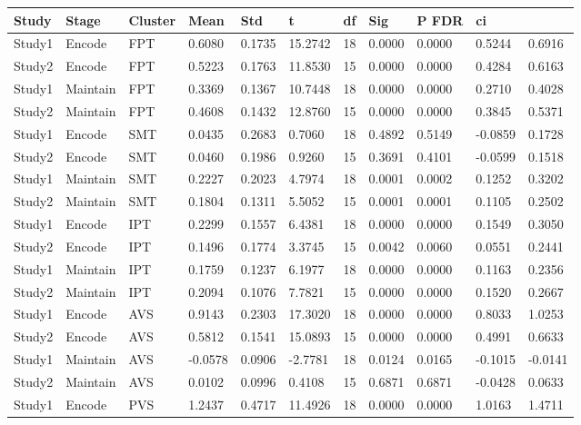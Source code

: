 \begin{table}
\centering
\begin{tabular}[0.2em]{@{}lllllllllll@{}}\toprule
Study & Stage & Cluster & Mean & Std & t & df & Sig & P FDR & ci\\\toprule[0.2em]
Study1 & Encode & FPT & 0.6080 & 0.1735 & 15.2742 & 18 & 0.0000 & 0.0000 & 0.5244 & 0.6916 \\\midrule
Study2 & Encode & FPT & 0.5223 & 0.1763 & 11.8530 & 15 & 0.0000 & 0.0000 & 0.4284 & 0.6163 \\\midrule
Study1 & Maintain & FPT & 0.3369 & 0.1367 & 10.7448 & 18 & 0.0000 & 0.0000 & 0.2710 & 0.4028 \\\midrule
Study2 & Maintain & FPT & 0.4608 & 0.1432 & 12.8760 & 15 & 0.0000 & 0.0000 & 0.3845 & 0.5371 \\\midrule
Study1 & Encode & SMT & 0.0435 & 0.2683 & 0.7060 & 18 & 0.4892 & 0.5149 & -0.0859 & 0.1728 \\\midrule
Study2 & Encode & SMT & 0.0460 & 0.1986 & 0.9260 & 15 & 0.3691 & 0.4101 & -0.0599 & 0.1518 \\\midrule
Study1 & Maintain & SMT & 0.2227 & 0.2023 & 4.7974 & 18 & 0.0001 & 0.0002 & 0.1252 & 0.3202 \\\midrule
Study2 & Maintain & SMT & 0.1804 & 0.1311 & 5.5052 & 15 & 0.0001 & 0.0001 & 0.1105 & 0.2502 \\\midrule
Study1 & Encode & IPT & 0.2299 & 0.1557 & 6.4381 & 18 & 0.0000 & 0.0000 & 0.1549 & 0.3050 \\\midrule
Study2 & Encode & IPT & 0.1496 & 0.1774 & 3.3745 & 15 & 0.0042 & 0.0060 & 0.0551 & 0.2441 \\\midrule
Study1 & Maintain & IPT & 0.1759 & 0.1237 & 6.1977 & 18 & 0.0000 & 0.0000 & 0.1163 & 0.2356 \\\midrule
Study2 & Maintain & IPT & 0.2094 & 0.1076 & 7.7821 & 15 & 0.0000 & 0.0000 & 0.1520 & 0.2667 \\\midrule
Study1 & Encode & AVS & 0.9143 & 0.2303 & 17.3020 & 18 & 0.0000 & 0.0000 & 0.8033 & 1.0253 \\\midrule
Study2 & Encode & AVS & 0.5812 & 0.1541 & 15.0893 & 15 & 0.0000 & 0.0000 & 0.4991 & 0.6633 \\\midrule
Study1 & Maintain & AVS & -0.0578 & 0.0906 & -2.7781 & 18 & 0.0124 & 0.0165 & -0.1015 & -0.0141 \\\midrule
Study2 & Maintain & AVS & 0.0102 & 0.0996 & 0.4108 & 15 & 0.6871 & 0.6871 & -0.0428 & 0.0633 \\\midrule
Study1 & Encode & PVS & 1.2437 & 0.4717 & 11.4926 & 18 & 0.0000 & 0.0000 & 1.0163 & 1.4711 \\\midrule

\end{tabular}
\end{table}
